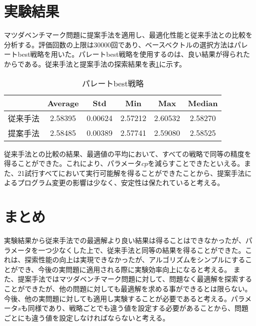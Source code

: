 \documentclass[a4paper,twocolumn,10pt]{jarticle}
\begin{document}
\section{実験結果}
マツダベンチマーク問題に提案手法を適用し、最適化性能と従来手法との比較を分析する。評価回数の上限は30000回であり、ベースベクトルの選択方法はパレートbest戦略を用いた。パレートbest戦略を使用するのは、良い結果が得られたからである。従来手法と提案手法の探索結果を表\ref{tbl:パレートbest}に示す。
\begin{table}[htbp]
\begin{center}
\caption{パレートbest戦略}
\label{tbl:パレートbest}
\begin{tabular}{|c|c|c|c|c|c|}
\hline
      & Average & Std & Min & Max & Median  \\ \hline
従来手法 & 2.58395	& 0.00624 & 2.57212 & 2.60532 & 2.58270\\ \hline
提案手法 & 2.58485 & 0.00389 & 2.57741 & 2.59080 & 2.58525\\ \hline
\end{tabular}
\end{center}
\end{table}

従来手法との比較の結果、最適値の平均において、すべての戦略で同等の精度を得ることができた。これにより、パラメータ$cp$を減らすことできたといえる。また、21試行すべてにおいて実行可能解を得ることができたことから、提案手法によるプログラム変更の影響は少なく、安定性は保たれていると考える。


\section{まとめ}
実験結果から従来手法での最適解より良い結果は得ることはできなかったが、パラメータを一つ少なくした上で、従来手法と同等の結果を得ることができた。これは、探索性能の向上は実現できなかったが、アルゴリズムをシンプルにすることができ、今後の実問題に適用される際に実験効率向上になると考える。
また、提案手法ではマツダベンチマーク問題に対して、問題なく最適解を探索することができたが、他の問題に対しても最適解を求める事ができるとは限らない。今後、他の実問題に対しても適用し実験することが必要であると考える。パラメータ$s$も同様であり、戦略ごとでも違う値を設定する必要があることから、問題ごとにも違う値を設定しなければならないと考える。




\end{document}
